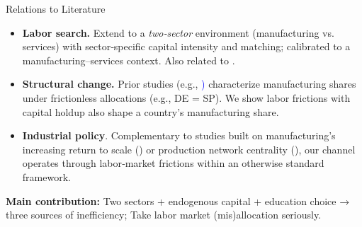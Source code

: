 \documentclass[9pt,xcolor={svgnames}]{beamer}
\begin{document}
\begin{frame}{Relations to Literature}

\begin{itemize}
    \item \textbf{Labor search.}   Extend \textcolor{blue}{\cite{acemoglu1999holdups}} to a \emph{two‐sector} environment (manufacturing vs. services) with sector‐specific capital intensity and matching; calibrated to a manufacturing–services context. Also related to \textcolor{blue}{\cite{cardullo2015sunk}}.

    \medskip

    \item \textbf{Structural change.} Prior studies (e.g., \textcolor{blue}{\cite{Rodrik2016, huneeus2024heterogeneous})}  characterize manufacturing shares under frictionless allocations (e.g., DE = SP).  We show labor frictions with capital holdup also shape a country's manufacturing share.

\medskip

    \item \textbf{Industrial policy}.  Complementary to studies built on manufacturing's increasing return to scale (\textcolor{blue}{\cite{matsuyama1991increasing}}) or production network centrality (\textcolor{blue}{\cite{liu2019industrial}}), our channel operates through labor‐market frictions within an otherwise standard framework.
\end{itemize}

\vspace{1em}
\textbf{Main contribution:} Two sectors + endogenous capital + education choice → three sources of inefficiency; Take labor market (mis)allocation seriously. 
\end{frame}
\end{document}
